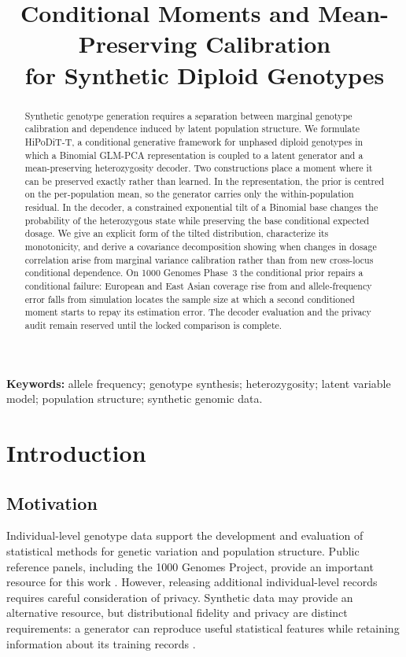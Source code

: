 \documentclass[11pt,a4paper]{article}
\title{Conditional Moments and Mean-Preserving Calibration\\for Synthetic Diploid Genotypes}
\author{}
\date{}
\begin{document}
\maketitle
\vspace{-2.4em}
\begin{abstract}
Synthetic genotype generation requires a separation between marginal genotype
calibration and dependence induced by latent population structure. We formulate
HiPoDiT-T, a conditional generative framework for unphased diploid genotypes in
which a Binomial GLM-PCA representation is coupled to a latent generator and a
mean-preserving heterozygosity decoder. Two constructions place a moment where
it can be preserved exactly rather than learned. In the representation, the
prior is centred on the per-population mean, so the generator carries only the
within-population residual. In the decoder, a constrained exponential tilt of a
Binomial base changes the probability of the heterozygous state while preserving
the base conditional expected dosage. We give an explicit form of the tilted
distribution, characterize its monotonicity, and derive a covariance
decomposition showing when changes in dosage correlation arise from marginal
variance calibration rather than from new cross-locus conditional dependence.
On 1000 Genomes Phase~3 the conditional prior repairs a conditional failure:
European and East Asian coverage rise from %
and %
allele-frequency error falls from %
simulation locates the sample size at which a second conditioned moment starts
to repay its estimation error. The decoder evaluation and the privacy audit
remain reserved until the locked comparison is complete.
\end{abstract}
\textbf{Keywords:} allele frequency; genotype synthesis; heterozygosity; latent variable model; population structure; synthetic genomic data.

\section{Introduction}
\label{sec:intro}

\subsection{Motivation}
\label{sec:motivation}

Individual-level genotype data support the development and evaluation of
statistical methods for genetic variation and population structure. Public
reference panels, including the 1000 Genomes Project, provide an important
resource for this work \citep{Auton2015}. However, releasing additional
individual-level records requires careful consideration of privacy.
Synthetic data may provide an alternative resource, but distributional fidelity
and privacy are distinct requirements: a generator can reproduce useful
statistical features while retaining information about its training records
\citep{Oprisanu2022}.
\end{document}

